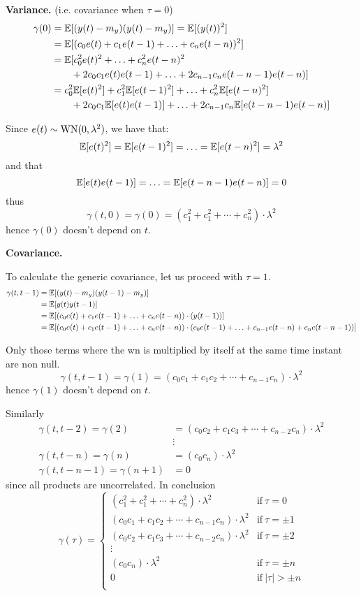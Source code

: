 \textbf{Variance.} (i.e. covariance when $\tau =0$)
\begin{align*}
	\gamma (0)&=\mathbb{E}[(y(t)-m_{y})(y(t)-m_{y})]=\mathbb{E}[(y(t))^2]\\
	&=\mathbb{E}[(c_{0} e(t)+c_{1} e(t-1)+\ldots+c_{n} e(t-n))^{2}]\\
	&=\mathbb{E}[c_{0}^{2} e(t)^{2}+\ldots+c_{n}^{2} e(t-n)^{2}\\
	&\qquad+2 c_{0} c_{1} e(t) e(t-1)+\ldots+2 c_{n-1} c_{n} e(t-n-1) e(t-n)]\\
	&=c_{0}^{2} \mathbb{E}[e(t)^{2}]+c_{1}^{2} \mathbb{E}[e(t-1)^{2}]+\ldots+c_{n}^{2} \mathbb{E}[e(t-n)^{2}]\\
	&\qquad+2 c_{0} c_{1} \mathbb{E}[e(t) e(t-1)]+\ldots+2 c_{n-1} c_{n} \mathbb{E}[e(t-n-1) e(t-n)]
\end{align*}

Since $e(t) \sim \operatorname{WN}(0, \lambda^{2})$, we have that:
$$
\mathbb{E}[e(t)^{2}]=\mathbb{E}[e(t-1)^{2}]=\ldots=\mathbb{E}[e(t-n)^{2}]=\lambda^{2}
$$
and that
$$
\mathbb{E}[e(t) e(t-1)]=\ldots=\mathbb{E}[e(t-n-1) e(t-n)]=0
$$
thus
\[
	\boxed{\gamma (t,0)=\gamma (0)=(c_{1}^2 +c_{1}^2 +\cdots+c_{n}^2 )\cdot\lambda^2}
\]
hence $\gamma (0)$ doesn't depend on $t$.

\textbf{Covariance.}

To calculate the generic covariance, let us proceed with $\tau =1$.
\begin{align*}
	\gamma(t, t-1)&=\mathbb{E}[(y(t)-m_{y})(y(t-1)-m_{y})]\\
	&=\mathbb{E}[y(t) y(t-1)]\\
	&=\mathbb{E}[(c_{0} e(t)+c_{1} e(t-1)+\ldots+c_{n} e(t-n))\cdot (y(t-1))]\\
	&=\mathbb{E}[(c_{0} e(t)+c_{1} e(t-1)+\ldots+c_{n} e(t-n))\cdot (c_{0} e(t-1)+\ldots+c_{n-1} e(t-n)+c_{n} e(t-n-1))]
\end{align*}

Only those terms where the \gls{wn} is multiplied by itself at the same time instant are non null.
\[
	\gamma(t, t-1)=\gamma (1)=(c_{0}c_{1}+c_{1}c_{2}+\cdots+c_{n-1}c_{n})\cdot\lambda^2
\]
hence $\gamma (1)$ doesn't depend on $t$.

Similarly
\begin{align*}
	\gamma (t,t-2)=\gamma (2) &= (c_{0}c_{2}+c_{1}c_{3}+\cdots+c_{n-2}c_{n})\cdot\lambda^2\\
	&\vdots\\
	\gamma (t,t-n)=\gamma (n) &= (c_{0}c_{n})\cdot\lambda^2\\
	\gamma (t,t-n-1)=\gamma (n+1) &= 0
\end{align*}
since all products are uncorrelated. In conclusion
\[
	\gamma (\tau )=\begin{cases}
		(c_{1}^2 +c_{1}^2 +\cdots+c_{n}^2 )\cdot\lambda^2 & \text{if}\ \tau =0\\
		(c_{0}c_{1}+c_{1}c_{2}+\cdots+c_{n-1}c_{n})\cdot\lambda^2 & \text{if}\ \tau =\pm 1\\
		(c_{0}c_{2}+c_{1}c_{3}+\cdots+c_{n-2}c_{n})\cdot\lambda^2 & \text{if}\ \tau =\pm 2\\
		\vdots\\
		(c_{0}c_{n})\cdot\lambda^2 & \text{if}\ \tau =\pm n\\
		0 & \text{if}\ |\tau| > \pm n\\
	\end{cases}
\]
